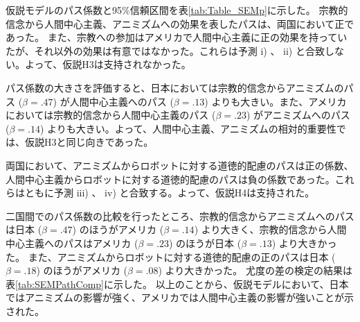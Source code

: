 \documentclass[a4j,12pt]{jreport}
\begin{document}
\clearpage


仮説モデルのパス係数と95\%信頼区間を表\ref{tab:Table_SEMp}に示した。
宗教的信念から人間中心主義、アニミズムへの効果を表したパスは、両国において正であった。
また、宗教への参加はアメリカで人間中心主義に正の効果を持っていたが、それ以外の効果は有意ではなかった。これらは予測 i) 、 ii) と合致しない。よって、仮説H3は支持されなかった。







パス係数の大きさを評価すると、日本においては宗教的信念からアニミズムのパス ($\beta=.47$) が人間中心主義へのパス ($\beta=.13$) よりも大きい。また、アメリカにおいては宗教的信念から人間中心主義のパス ($\beta=.23$) がアニミズムへのパス ($\beta=.14$) よりも大きい。よって、人間中心主義、アニミズムの相対的重要性では、仮説H3と同じ向きであった。



両国において、アニミズムからロボットに対する道徳的配慮のパスは正の係数、人間中心主義からロボットに対する道徳的配慮のパスは負の係数であった。これらはともに予測 iii) 、 iv) と合致する。よって、仮説H4は支持された。



二国間でのパス係数の比較を行ったところ、宗教的信念からアニミズムへのパスは日本 ($\beta=.47$) のほうがアメリカ ($\beta=.14$) より大きく、宗教的信念から人間中心主義へのパスはアメリカ ($\beta=.23$) のほうが日本 ($\beta=.13$) より大きかった。
また、アニミズムからロボットに対する道徳的配慮の正のパスは日本 ($\beta=.18$) のほうがアメリカ ($\beta=.08$) より大きかった。
尤度の差の検定の結果は表\ref{tab:SEMPathComp}に示した。
以上のことから、仮説モデルにおいて、日本ではアニミズムの影響が強く、アメリカでは人間中心主義の影響が強いことが示された。
\end{document}
